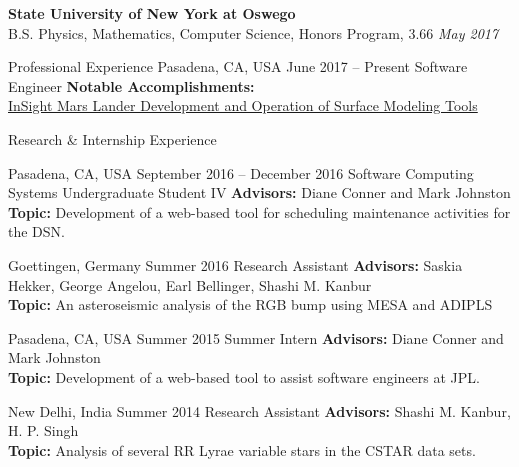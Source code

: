 \documentclass{resume} %
\begin{document}
\textbf{State University of New York at Oswego}
\\
B.S. Physics, Mathematics, Computer Science, Honors Program, 3.66
\hfill
\emph{May 2017}

\begin{rSection}{Professional Experience}{}
           {Pasadena, CA, USA}
           {June 2017 -- Present}
           {Software Engineer}
           {
        \textbf{Notable Accomplishments:}\\
        \href{http://www.oswegocountynewsnow.com/news/mars-landing-puts-phoenix-native-suny-oswego-grad-roffo-among/article_968bd574-f34c-11e8-8c5b-b7d557e9f682.html?fbclid=IwAR1iCW3CdQIRr2JIy1f96utXjzzidSJ6vA13jVgvkjKIU6PopaLHYkpbQrw}{InSight Mars Lander Development and Operation of Surface Modeling Tools}
    }
\end{rSection}

\begin{rSection}{Research \& Internship Experience}{}

           {Pasadena, CA, USA}
           {September 2016 -- December 2016}
           {Software Computing Systems Undergraduate Student IV}
           {
    \textbf{Advisors:}
    Diane Conner and Mark Johnston
    \\
    \textbf{Topic:}
    Development of a web-based tool for scheduling maintenance activities for the DSN.
  }

           {Goettingen, Germany}
           {Summer 2016}
           {Research Assistant}
           {
    \textbf{Advisors:}
    Saskia Hekker, George Angelou, Earl Bellinger, Shashi M. Kanbur
    \\
    \textbf{Topic:}
    An asteroseismic analysis of the RGB bump using MESA and ADIPLS
  }

           {Pasadena, CA, USA}
           {Summer 2015}
           {Summer Intern}
           {
    \textbf{Advisors:}
    Diane Conner and Mark Johnston
    \\
    \textbf{Topic:}
    Development of a web-based tool to assist software engineers at JPL.
  }

           {New Delhi, India}
           {Summer 2014}
           {Research Assistant}
           {
    \textbf{Advisors:}
    Shashi M. Kanbur, H. P. Singh
    \\
    \textbf{Topic:}
    Analysis of several RR Lyrae variable stars in the CSTAR data sets.
  }

\end{rSection}
\end{document}

